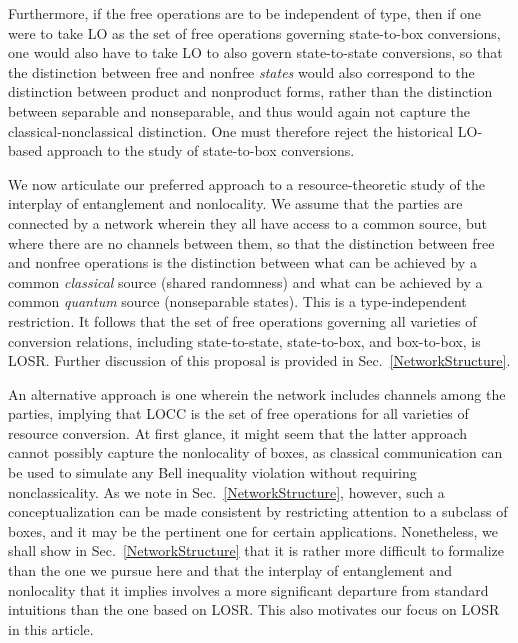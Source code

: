\documentclass[12pt]{article}
\theoremstyle{plain}
\theoremstyle{definition}
\begin{document}
Furthermore, if the free operations are to be independent of type, 
then if one were to take LO as the set of free operations governing state-to-box conversions, one would also have to take LO to also govern state-to-state conversions, so that the distinction between free and nonfree {\em states} would also correspond to the distinction between product and nonproduct forms, rather than the distinction between separable and nonseparable, and thus would again not capture the classical-nonclassical distinction.  One must therefore reject the historical LO-based approach to the study of state-to-box conversions.

  

We now articulate our preferred approach to a resource-theoretic study of the interplay of entanglement and nonlocality.  We assume that the parties are connected by a network wherein they all have access to a common source, but where there are no channels between them, so that the distinction between free and nonfree operations is the distinction between what can be achieved by a common {\em classical} source (shared randomness) and what can be achieved by a common {\em quantum} source (nonseparable states).
This is a type-independent restriction. It follows that the set of free operations governing all varieties of conversion relations, including state-to-state, state-to-box, and box-to-box, is LOSR.  Further discussion of this proposal is provided in Sec.~\ref{NetworkStructure}.
 
An alternative approach  is one wherein the network includes channels among the parties, implying that LOCC is the set of free operations for all varieties of resource conversion.   At first glance, it might seem that the latter approach cannot possibly capture
  the nonlocality of boxes, as classical communication can be used to simulate any Bell inequality violation without requiring nonclassicality.  As we note in Sec.~\ref{NetworkStructure}, however, such a conceptualization can be made consistent by restricting attention to 
   a subclass of boxes, and it may be the pertinent one for certain applications.  Nonetheless, we shall show in Sec.~\ref{NetworkStructure} that it is rather more difficult to formalize than the one we pursue here and that the interplay of entanglement and nonlocality that it implies involves a more significant departure from standard intuitions than the one based on LOSR.  This also motivates our focus on LOSR in this article.
\end{document}
